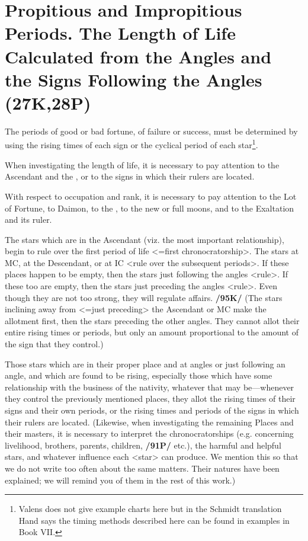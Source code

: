 \section{Propitious and Impropitious Periods. The Length of Life Calculated from the Angles and the Signs Following the Angles (27K,28P)}

The periods of good or bad fortune, of failure or success, must be determined by using the rising times of each sign or the cyclical period of each star\footnote{Valens does not give example charts here but in the Schmidt translation Hand says the timing methods described here can be found in examples in Book VII.}.

When investigating the length of life, it is necessary to pay attention to the Ascendant and the \Moon, or to the signs in which their rulers are located. 

With respect to occupation and rank, it is necessary to pay attention to the Lot of Fortune, to Daimon, to the \Sun, to the
new or full moons, and to the Exaltation and its ruler. 

The stars which are in the Ascendant (viz. the most important relationship), begin to rule over the first period of life <=first chronocratorship>. The stars at MC, at the Descendant, or at IC <rule over the subsequent periods>. If these places happen to be empty, then the stars just following the angles <rule>. If these too are empty, then the stars just preceding the angles <rule>. Even though they are not too strong, they will regulate affairs. \textbf{/95K/} (The stars inclining away from <=just preceding> the Ascendant or MC make the allotment first, then the stars preceding the
other angles. They cannot allot their entire rising times or periods, but only an amount proportional to the amount of the sign that they control.) 

Those stars which are in their proper place and at angles or just following an angle, and which are found to be rising, especially those which have some relationship with the business of the nativity, whatever that may be—whenever they control the previously mentioned places, they allot the rising times of their signs and their own periods, or the rising times and periods of the signs in which their rulers are located. \mndl (Likewise, when investigating the remaining Places and their masters, it is necessary to interpret the chronocratorships (e.g. concerning livelihood, brothers, parents, children, \textbf{/91P/} etc.), the harmful and helpful stars, and whatever influence each <star> can produce. We mention this so that we do not write too often about the same matters. Their natures have been explained; we will remind you of them in the rest of this work.)

